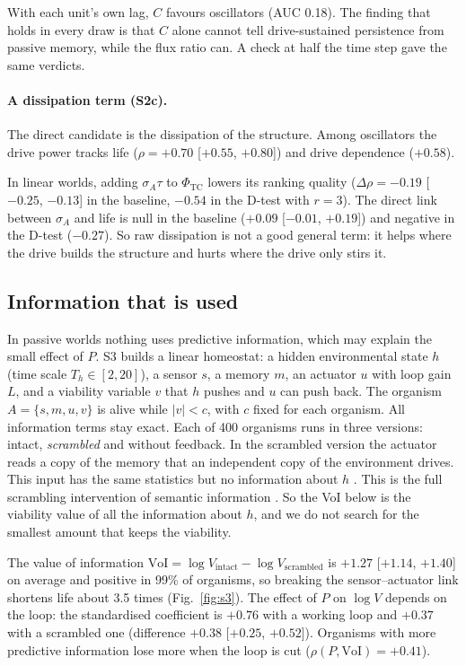 \documentclass[11pt]{article}
\newcommand{\PhiTC}{\Phi_{\mathrm{TC}}}
\begin{document}
With each unit's own lag, $C$ favours oscillators (AUC 0.18). The finding that holds in every draw is that $C$ alone cannot tell drive-sustained persistence from passive memory, while the flux ratio
can. A check at half the time step gave the same verdicts.

\paragraph{A dissipation term (S2c).} The direct candidate is the dissipation of the structure. Among oscillators the
drive power tracks life ($\rho = +0.70$ [$+0.55$, $+0.80$]) and drive dependence ($+0.58$).

In linear worlds, adding
$\sigma_A\tau$ to $\PhiTC$ lowers its ranking quality ($\Delta\rho = -0.19$ [$-0.25$, $-0.13$] in the baseline, $-0.54$
in the D-test with $r=3$). The direct link between $\sigma_A$ and life is null in the baseline ($+0.09$ [$-0.01$,
$+0.19$]) and negative in the D-test ($-0.27$). So raw dissipation is not a good general term: it helps where the drive
builds the structure and hurts where the drive only stirs it.

\subsection{Information that is used}
\label{sec:agency}
In passive worlds nothing uses predictive information, which may explain the small effect of $P$. S3 builds a linear
homeostat: a hidden environmental state $h$ (time scale $T_h\in[2,20]$), a sensor $s$, a memory $m$, an actuator $u$
with loop gain $L$, and a viability variable $v$ that $h$ pushes and $u$ can push back. The organism $A=\{s,m,u,v\}$ is
alive while $|v|<c$, with $c$ fixed for each organism. All information terms stay exact. Each of 400 organisms runs in
three versions: intact, \emph{scrambled} and without feedback. In the scrambled version the actuator reads a copy of the
memory that an independent copy of the environment drives. This input has the same statistics but no information about
$h$ \cite{KolchinskyWolpert18}. This is the full scrambling intervention of semantic information
\cite{KolchinskyWolpert18,Sowinski23}. So the VoI below is the viability value of all the information about $h$, and we
do not search for the smallest amount that keeps the viability.

The value of information $\mathrm{VoI} = \log V_{\mathrm{intact}} - \log V_{\mathrm{scrambled}}$ is $+1.27$ [$+1.14$,
$+1.40$] on average and positive in 99\% of organisms, so breaking the sensor--actuator link shortens life about
3.5 times (Fig.~\ref{fig:s3}). The effect of $P$ on $\log V$ depends on the loop: the standardised coefficient is
$+0.76$ with a working loop and $+0.37$ with a scrambled one (difference $+0.38$ [$+0.25$, $+0.52$]). Organisms with more
predictive information lose more when the loop is cut ($\rho(P,\mathrm{VoI}) = +0.41$).
\end{document}
